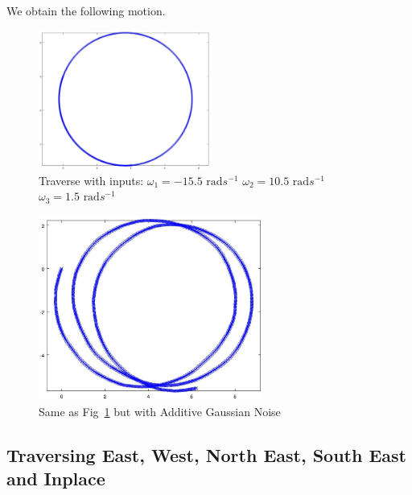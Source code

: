 \documentclass{article}
\begin{document}
We obtain the following motion.

\begin{figure}[H]
	\centering
	\includegraphics[width=0.5\textwidth]{images/traverse_predefined.jpg}
	\caption{Traverse with inputs:
		$\omega_{1} = -15.5 \text{ rad} s^{-1}$
		$\omega_{2} = 10.5 \text{ rad} s^{-1}$
		$\omega_{3} = 1.5 \text{ rad} s^{-1}$
	}
	\label{fig:omni_robot_predefined}
\end{figure}

\begin{figure}[H]
	\centering
	\includegraphics[width=0.65\textwidth]{images/traverse_predefined_with_noise.jpg}
	\caption{Same as Fig~\ref{fig:omni_robot_predefined} but with Additive 
	Gaussian Noise}
	\label{fig:omni_robot_predefined_with_noise}
\end{figure}



\subsection{Traversing East, West, North East, South East and Inplace}
\label{subsec:traverse_directions}
\end{document}
